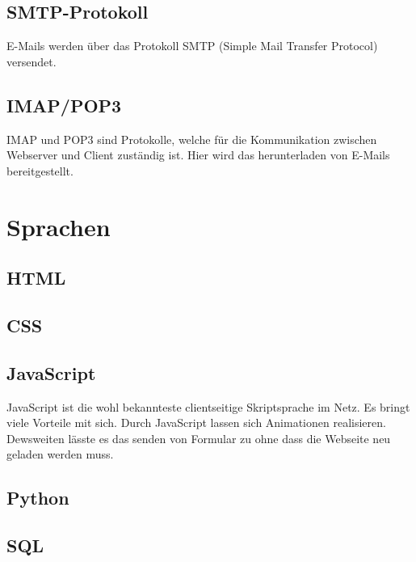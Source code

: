 \subsection{SMTP-Protokoll}
E-Mails werden über das Protokoll SMTP (Simple Mail Transfer Protocol) versendet.

\subsection{IMAP/POP3}
IMAP und POP3 sind Protokolle, welche für die Kommunikation zwischen Webserver und Client zuständig ist. Hier wird das herunterladen von E-Mails bereitgestellt.


\section{Sprachen}
\subsection{HTML}

\subsection{CSS}

\subsection{JavaScript}
JavaScript ist die wohl bekannteste clientseitige Skriptsprache im Netz. Es bringt viele Vorteile mit sich. Durch JavaScript lassen sich Animationen realisieren. Dewsweiten lässte es das senden von Formular zu ohne dass die Webseite neu geladen werden muss.\cite{WebScraping}
\subsection{Python}

\subsection{SQL}



